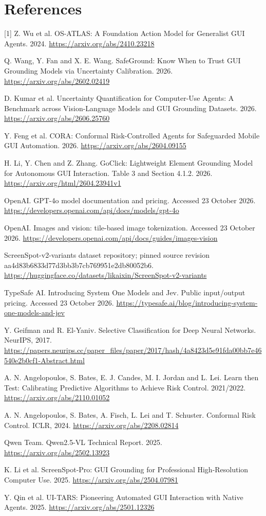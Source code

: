 \documentclass[10pt]{article}
\begin{document}
\section*{References}
[1] Z. Wu et al. OS-ATLAS: A Foundation Action Model for Generalist GUI Agents. 2024. \url{https://arxiv.org/abs/2410.23218}\par
[2] Q. Wang, Y. Fan and X. E. Wang. SafeGround: Know When to Trust GUI Grounding Models via Uncertainty Calibration. 2026. \url{https://arxiv.org/abs/2602.02419}\par
[3] D. Kumar et al. Uncertainty Quantification for Computer-Use Agents: A Benchmark across Vision-Language Models and GUI Grounding Datasets. 2026. \url{https://arxiv.org/abs/2606.25760}\par
[4] Y. Feng et al. CORA: Conformal Risk-Controlled Agents for Safeguarded Mobile GUI Automation. 2026. \url{https://arxiv.org/abs/2604.09155}\par
[5] H. Li, Y. Chen and Z. Zhang. GoClick: Lightweight Element Grounding Model for Autonomous GUI Interaction. Table 3 and Section 4.1.2. 2026. \url{https://arxiv.org/html/2604.23941v1}\par
[6] OpenAI. GPT-4o model documentation and pricing. Accessed 23 October 2026. \url{https://developers.openai.com/api/docs/models/gpt-4o}\par
[7] OpenAI. Images and vision: tile-based image tokenization. Accessed 23 October 2026. \url{https://developers.openai.com/api/docs/guides/images-vision}\par
[8] ScreenSpot-v2-variants dataset repository; pinned source revision aa4d83b6833d77d3bb3b7cb769951e2db80052b6. \url{https://huggingface.co/datasets/likaixin/ScreenSpot-v2-variants}\par
[9] TypeSafe AI. Introducing System One Models and Jev. Public input/output pricing. Accessed 23 October 2026. \url{https://typesafe.ai/blog/introducing-system-one-models-and-jev}\par
[10] Y. Geifman and R. El-Yaniv. Selective Classification for Deep Neural Networks. NeurIPS, 2017. \url{https://papers.neurips.cc/paper_files/paper/2017/hash/4a8423d5e91fda00bb7e46540e2b0cf1-Abstract.html}\par
[11] A. N. Angelopoulos, S. Bates, E. J. Candes, M. I. Jordan and L. Lei. Learn then Test: Calibrating Predictive Algorithms to Achieve Risk Control. 2021/2022. \url{https://arxiv.org/abs/2110.01052}\par
[12] A. N. Angelopoulos, S. Bates, A. Fisch, L. Lei and T. Schuster. Conformal Risk Control. ICLR, 2024. \url{https://arxiv.org/abs/2208.02814}\par
[13] Qwen Team. Qwen2.5-VL Technical Report. 2025. \url{https://arxiv.org/abs/2502.13923}\par
[14] K. Li et al. ScreenSpot-Pro: GUI Grounding for Professional High-Resolution Computer Use. 2025. \url{https://arxiv.org/abs/2504.07981}\par
[15] Y. Qin et al. UI-TARS: Pioneering Automated GUI Interaction with Native Agents. 2025. \url{https://arxiv.org/abs/2501.12326}\par
\end{document}
